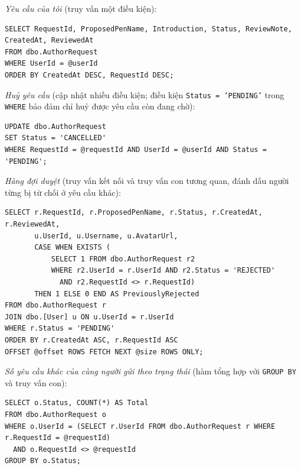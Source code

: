 \textit{Yêu cầu của tôi} (truy vấn một điều kiện):
\begin{verbatim}
SELECT RequestId, ProposedPenName, Introduction, Status, ReviewNote, CreatedAt, ReviewedAt
FROM dbo.AuthorRequest
WHERE UserId = @userId
ORDER BY CreatedAt DESC, RequestId DESC;
\end{verbatim}

\textit{Huỷ yêu cầu} (cập nhật nhiều điều kiện; điều kiện \texttt{Status = 'PENDING'} trong \texttt{WHERE} bảo đảm chỉ huỷ được yêu cầu còn đang chờ):
\begin{verbatim}
UPDATE dbo.AuthorRequest
SET Status = 'CANCELLED'
WHERE RequestId = @requestId AND UserId = @userId AND Status = 'PENDING';
\end{verbatim}

\textit{Hàng đợi duyệt} (truy vấn kết nối và truy vấn con tương quan, đánh dấu người từng bị từ chối ở yêu cầu khác):
\begin{verbatim}
SELECT r.RequestId, r.ProposedPenName, r.Status, r.CreatedAt, r.ReviewedAt,
       u.UserId, u.Username, u.AvatarUrl,
       CASE WHEN EXISTS (
           SELECT 1 FROM dbo.AuthorRequest r2
           WHERE r2.UserId = r.UserId AND r2.Status = 'REJECTED'
             AND r2.RequestId <> r.RequestId)
       THEN 1 ELSE 0 END AS PreviouslyRejected
FROM dbo.AuthorRequest r
JOIN dbo.[User] u ON u.UserId = r.UserId
WHERE r.Status = 'PENDING'
ORDER BY r.CreatedAt ASC, r.RequestId ASC
OFFSET @offset ROWS FETCH NEXT @size ROWS ONLY;
\end{verbatim}

\textit{Số yêu cầu khác của cùng người gửi theo trạng thái} (hàm tổng hợp với \texttt{GROUP BY} và truy vấn con):
\begin{verbatim}
SELECT o.Status, COUNT(*) AS Total
FROM dbo.AuthorRequest o
WHERE o.UserId = (SELECT r.UserId FROM dbo.AuthorRequest r WHERE r.RequestId = @requestId)
  AND o.RequestId <> @requestId
GROUP BY o.Status;
\end{verbatim}

